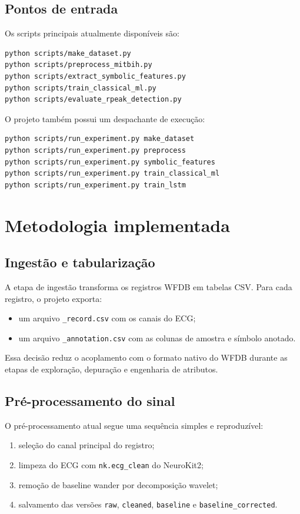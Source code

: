 \documentclass[12pt,a4paper]{article}
\begin{document}
\subsection{Pontos de entrada}
Os scripts principais atualmente dispon\'iveis s\~ao:

\begin{verbatim}
python scripts/make_dataset.py
python scripts/preprocess_mitbih.py
python scripts/extract_symbolic_features.py
python scripts/train_classical_ml.py
python scripts/evaluate_rpeak_detection.py
\end{verbatim}

O projeto tamb\'em possui um despachante de execu\c{c}\~ao:

\begin{verbatim}
python scripts/run_experiment.py make_dataset
python scripts/run_experiment.py preprocess
python scripts/run_experiment.py symbolic_features
python scripts/run_experiment.py train_classical_ml
python scripts/run_experiment.py train_lstm
\end{verbatim}

\section{Metodologia implementada}
\subsection{Ingest\~ao e tabulariza\c{c}\~ao}
A etapa de ingest\~ao transforma os registros WFDB em tabelas CSV. Para cada registro, o projeto exporta:

\begin{itemize}
    \item um arquivo \texttt{\_record.csv} com os canais do ECG;
    \item um arquivo \texttt{\_annotation.csv} com as colunas de amostra e s\'imbolo anotado.
\end{itemize}

Essa decis\~ao reduz o acoplamento com o formato nativo do WFDB durante as etapas de explora\c{c}\~ao, depura\c{c}\~ao e engenharia de atributos.

\subsection{Pr\'e-processamento do sinal}
O pr\'e-processamento atual segue uma sequ\^encia simples e reproduz\'ivel:

\begin{enumerate}[label=\arabic*.]
    \item sele\c{c}\~ao do canal principal do registro;
    \item limpeza do ECG com \texttt{nk.ecg\_clean} do NeuroKit2;
    \item remo\c{c}\~ao de baseline wander por decomposi\c{c}\~ao wavelet;
    \item salvamento das vers\~oes \texttt{raw}, \texttt{cleaned}, \texttt{baseline} e \texttt{baseline\_corrected}.
\end{enumerate}
\end{document}
